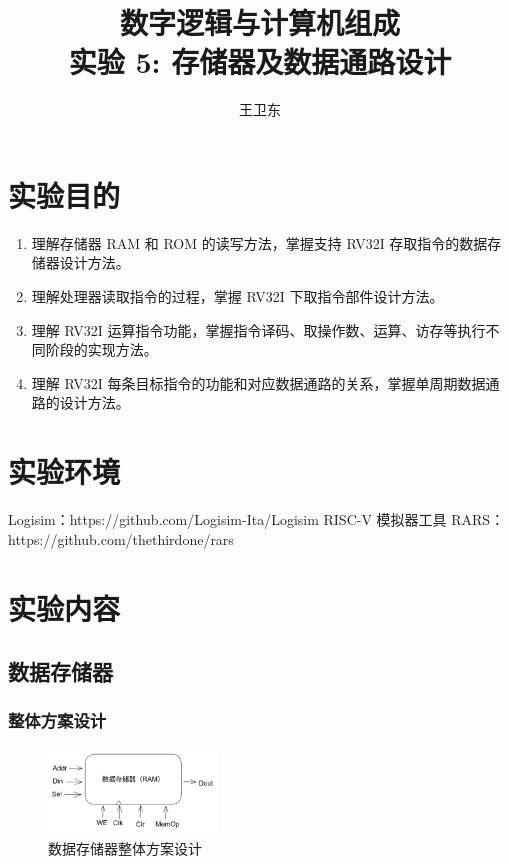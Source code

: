 \documentclass{article}
\title{数字逻辑与计算机组成\\ {\small 实验 5: 存储器及数据通路设计
}}
\author{王卫东\quad 221900332}
\date{\zhtoday}
\begin{document}
    \maketitle

    \section{实验目的}

    \begin{enumerate}
        \item 理解存储器 RAM 和 ROM 的读写方法，掌握支持 RV32I 存取指令的数据存储器设计方法。
        \item 理解处理器读取指令的过程，掌握 RV32I 下取指令部件设计方法。
        \item 理解 RV32I 运算指令功能，掌握指令译码、取操作数、运算、访存等执行不同阶段的实现方法。
        \item 理解 RV32I 每条目标指令的功能和对应数据通路的关系，掌握单周期数据通路的设计方法。
    \end{enumerate}
    \section{实验环境}

    Logisim：https://github.com/Logisim-Ita/Logisim
    RISC-V 模拟器工具 RARS：https://github.com/thethirdone/rars

    \section{实验内容}
    
    \subsection{数据存储器}

    \subsubsection{整体方案设计}
    \begin{figure}[H]
    \centering
    \includegraphics[width=0.4\textwidth]{1.1.png}
    \caption{数据存储器整体方案设计}
    \end{figure}
\end{document}

